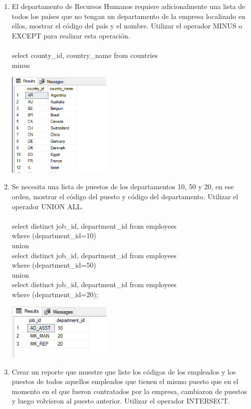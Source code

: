 \begin{enumerate}[1.]
	\item El departamento de Recursos Humanos requiere adicionalmente una lista de todos los pa\'ises que no tengan un departamento de la empresa localizado en ellos, mostrar el código del país y el nombre. Utilizar el operador MINUS o EXCEPT para realizar esta operaci\'on.
	\\
	\\select county\_id, country\_name from countries
	\\minus
	\begin{center}
	\includegraphics[width=5cm]{./Imagenes/ejercicio10-2} 
	\end{center}
	\item Se necesita una lista de puestos de los departamentos 10, 50 y 20, en ese orden, mostrar el c\'odigo del puesto y c\'odigo del departamento. Utilizar el operador UNION ALL.
	\\
	\\select distinct job\_id, department\_id from employees
	\\where (department\_id=10) 	
	\\union
	\\select distinct job\_id, department\_id from employees
	\\where (department\_id=50)
	\\union
	\\select distinct job\_id, department\_id from employees
	\\where  (department\_id=20);
	\begin{center}
	\includegraphics[width=5cm]{./Imagenes/ejercicio10-3} 
	\end{center}
	\item Crear un reporte que muestre que liste los c\'odigos de los empleados y los puestos de todos aquellos empleados que tienen el mismo puesto que en el momento en el que fueron contratados por la empresa, cambiaron de puestos y luego volvieron al puesto anterior. Utilizar el operador INTERSECT.

\end{enumerate}
